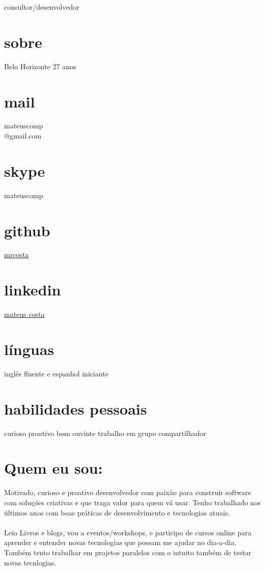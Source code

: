 \documentclass[]{friggeri-cv}
\begin{document}
       {consultor/desenvolvedor}

\begin{aside}
  \section{sobre}
    Belo Horizonte
    27 anos
  \section{mail}
    mateuscomp\\@gmail.com 
  \section{skype}
    mateuscomp
  \section{github}
    \href{https://github.com/mrcosta}{mrcosta}
  \section{linkedin}
    \href{www.linkedin.com/in/mateusrodriguescosta}{mateus costa}
  \section{línguas}
    inglês fluente e espanhol iniciante
  \section{habilidades pessoais}
  curioso
  proativo
  bom ouvinte
  trabalho em grupo
  compartilhador
\end{aside}

\section{Quem eu sou:}

Motivado, curioso e proativo desenvolvedor com paixão para construir software com soluções criativas e que traga valor para quem vá usar. Tenho trabalhado nos últimos anos com boas práticas de desenvolvimento e tecnologias atuais.\\\\ Leio Livros e blogs, vou a eventos/workshops, e participo de cursos online para aprender e entender novas tecnologias que possam me ajudar no dia-a-dia. Também tento trabalhar em projetos paralelos com o intuito também de testar novas tecnlogias.
\end{document}
